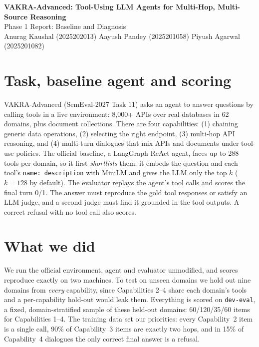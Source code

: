 \documentclass[10pt]{article}
\begin{document}
\begin{center}
{\fontsize{13}{16}\selectfont\bfseries VAKRA-Advanced: Tool-Using LLM Agents for Multi-Hop, Multi-Source Reasoning}\\[0.4em]
{\normalsize Phase 1 Report: Baseline and Diagnosis}\\[0.4em]
{\small Anurag Kaushal (2025202013) \quad Aayush Pandey (2025201058) \quad Piyush Agarwal (2025201082)}
\end{center}
\vspace{-0.2em}

\section{Task, baseline agent and scoring}
VAKRA-Advanced (SemEval-2027 Task 11) asks an agent to answer questions by calling tools in a
live environment: 8,000+ APIs over real databases in 62 domains, plus document collections.
There are four capabilities: (1) chaining generic data operations, (2) selecting the right
endpoint, (3) multi-hop API reasoning, and (4) multi-turn dialogues that mix APIs and documents
under tool-use policies. The official baseline, a LangGraph ReAct agent, faces up to 288 tools
per domain, so it first \emph{shortlists} them: it embeds the question and each tool's
\texttt{name: description} with MiniLM and gives the LLM only the top $k$ ($k{=}128$ by default).
The evaluator replays the agent's tool calls and scores the final turn 0/1. The answer must
reproduce the gold tool responses or satisfy an LLM judge, and a second judge must find it
grounded in the tool outputs. A correct refusal with no tool call also scores.

\section{What we did}
We run the official environment, agent and evaluator unmodified, and scores reproduce exactly
on two machines. To test on unseen domains we hold out nine domains from \emph{every}
capability, since Capabilities 2--4 share each domain's tools and a per-capability hold-out
would leak them. Everything is scored on \texttt{dev-eval}, a fixed,
domain-stratified sample of these held-out domains: 60/120/35/60 items for Capabilities 1--4.
The training data set our priorities: every Capability~2 item is a single call, 90\% of
Capability~3 items are exactly two hops, and in 15\% of Capability~4 dialogues the only correct
final answer is a refusal.
\end{document}
